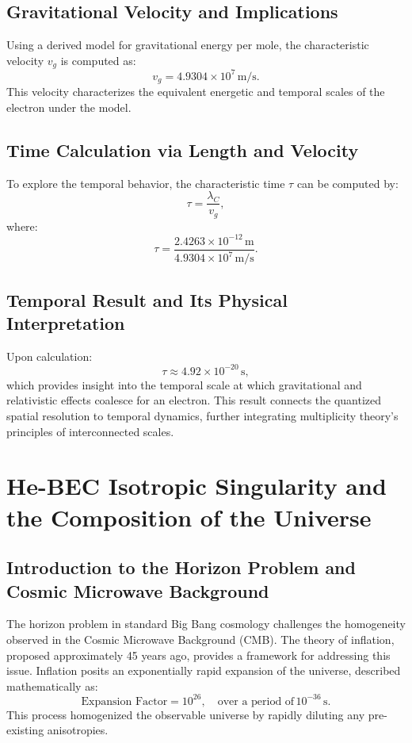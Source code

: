 \documentclass{article}
\theoremstyle{plain}
\begin{document}
\subsection{Gravitational Velocity and Implications}
Using a derived model for gravitational energy per mole, the characteristic velocity $v_g$ is computed as:
\[
v_g = 4.9304 \times 10^7 \, \mathrm{m/s}.
\]
This velocity characterizes the equivalent energetic and temporal scales of the electron under the model.

\subsection{Time Calculation via Length and Velocity}
To explore the temporal behavior, the characteristic time $\tau$ can be computed by:
\[
\tau = \frac{\lambda_C}{v_g},
\]
where:
\[
\tau = \frac{2.4263 \times 10^{-12} \, \mathrm{m}}{4.9304 \times 10^7 \, \mathrm{m/s}}.
\]

\subsection{Temporal Result and Its Physical Interpretation}
Upon calculation:
\[
\tau \approx 4.92 \times 10^{-20} \, \mathrm{s},
\]
which provides insight into the temporal scale at which gravitational and relativistic effects coalesce for an electron. This result connects the quantized spatial resolution to temporal dynamics, further integrating multiplicity theory's principles of interconnected scales.

\section{He-BEC Isotropic Singularity and the Composition of the Universe}

\subsection{Introduction to the Horizon Problem and Cosmic Microwave Background}
The horizon problem in standard Big Bang cosmology challenges the homogeneity observed in the Cosmic Microwave Background (CMB). The theory of inflation, proposed approximately 45 years ago, provides a framework for addressing this issue. Inflation posits an exponentially rapid expansion of the universe, described mathematically as:
\[
\text{Expansion Factor} = 10^{26}, \quad \text{over a period of} \, 10^{-36} \, \mathrm{s}.
\]
This process homogenized the observable universe by rapidly diluting any pre-existing anisotropies.
\end{document}
